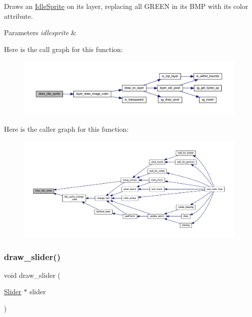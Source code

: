 Draws an \mbox{\hyperlink{struct_idle_sprite}{Idle\+Sprite}} on its layer, replacing all G\+R\+E\+EN in its B\+MP with its color attribute. 


\begin{DoxyParams}{Parameters}
{\em idlesprite} & \\
\hline
\end{DoxyParams}
Here is the call graph for this function\+:\nopagebreak
\begin{figure}[H]
\begin{center}
\leavevmode
\includegraphics[width=350pt]{group__sprite_gaeee668e211c134def251f737269b9d5e_cgraph}
\end{center}
\end{figure}
Here is the caller graph for this function\+:\nopagebreak
\begin{figure}[H]
\begin{center}
\leavevmode
\includegraphics[width=350pt]{group__sprite_gaeee668e211c134def251f737269b9d5e_icgraph}
\end{center}
\end{figure}
\mbox{\label{group__sprite_ga68e5ecf620b6fc346c992ef0eb49535f}} 
\subsubsection{\texorpdfstring{draw\+\_\+slider()}{draw\_slider()}}
{\footnotesize\ttfamily void draw\+\_\+slider (\begin{DoxyParamCaption}\item[{\mbox{\hyperlink{struct_slider}{Slider}} $\ast$}]{slider }\end{DoxyParamCaption})}



